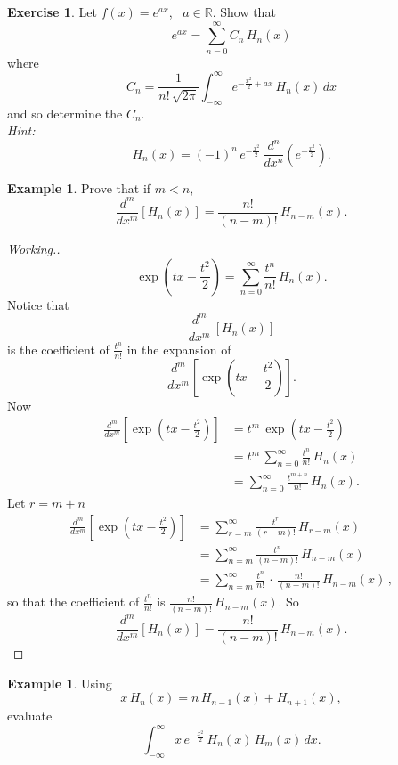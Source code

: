 \documentclass[12pt,a4paper]{report}
\theoremstyle{definition}
\newtheorem{exa}[thm]{Example}
\newtheorem{exe}[thm]{Exercise}
\theoremstyle{plain}
\begin{document}
\begin{exe}
Let $f(x) = e^{ax}$, \, $a\in \mathbb{R}$. Show that $$e^{ax} = \sum_{n = 0}^{\infty}C_n\, H_n(x)$$ where $$C_n = \frac{1}{n!\, \sqrt{2\pi}}\int^{\infty}_{-\infty} e^{-\frac{x^2}{2}+ ax}\, H_n(x)\, dx$$ and so determine the $C_n$.\\
\textit{Hint:} $$H_n(x) = (-1)^{n}\, e^{-\frac{x^2}{2}}\, \frac{d^n}{dx^n}\left(e^{-\frac{x^2}{2}}\right).$$
\end{exe}





\begin{exa}
Prove that if $m < n$, $$\frac{d^m}{dx^m}[H_n(x)] = \frac{n!}{(n-m)!}\, H_{n-m}(x).$$
\end{exa}

\begin{proof}[Working.]
$$\exp\left(tx - \frac{t^2}{2}\right) = \sum_{n=0}^{\infty} \frac{t^n}{n!}\, H_n(x).$$
Notice that $$\frac{d^m}{dx^m}\, [H_n(x)]$$ is the coefficient of $\frac{t^n}{n!}$ in the expansion of 
$$\frac{d^m}{dx^m}\left[\exp\left(tx - \frac{t^2}{2}\right)\right].$$ Now
\begin{align*}
\frac{d^m}{dx^m}\left[\exp\left(tx - \frac{t^2}{2}\right)\right] & = t^m\, \exp\left(tx - \frac{t^2}{2}\right)\\
 & = t^m\, \sum_{n = 0}^{\infty}\frac{t^n}{n!}\, H_n(x)\\
 & = \sum_{n=0}^{\infty} \frac{t^{m + n}}{n!}\, H_n(x).
\end{align*}
Let $r = m+n$
\begin{align*}
\frac{d^m}{dx^m}\left[\exp\left(tx - \frac{t^2}{2}\right)\right] & = \sum_{r=m}^{\infty} \frac{t^r}{(r-m)!}\, H_{r-m}(x)\\
 & = \sum_{n=m}^{\infty}\frac{t^n}{(n-m)!}\, H_{n-m}(x)\\
 & =\sum_{n=m}^{\infty}\frac{t^n}{n!}\, \cdot\, \frac{n!}{(n-m)!}\, H_{n-m}(x)\, ,
\end{align*}
so that the coefficient of $\frac{t^n}{n!}$ is $\frac{n!}{(n-m)!}\, H_{n-m}(x).$ So
$$\frac{d^m}{dx^m}[H_n(x)] = \frac{n!}{(n-m)!}\, H_{n-m}(x).$$
\end{proof}


\begin{exa}
Using $$x\, H_n(x) = n\, H_{n-1}(x) + H_{n+1}(x),$$ evaluate $$\int_{-\infty}^{\infty}x\, e^{-\frac{x^2}{2}}\, H_n(x)\, H_m(x)\, dx.$$
\end{exa}
\end{document}
